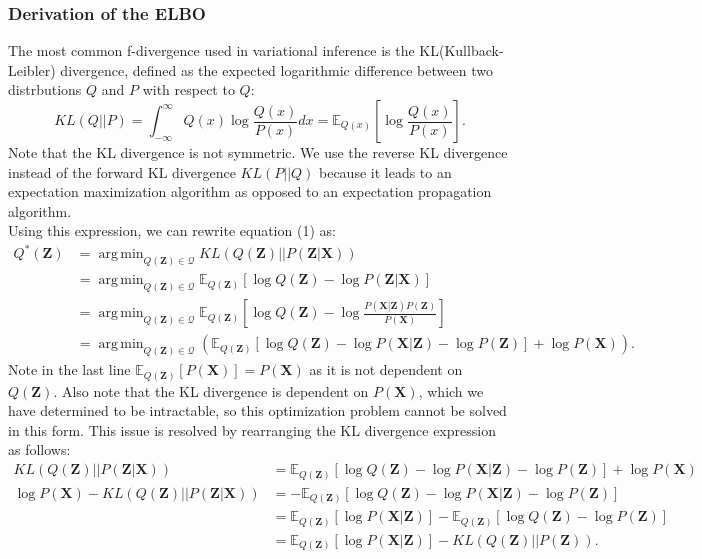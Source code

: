 \documentclass[a4paper,12pt]{article}
\DeclareMathOperator*{\argmin}{arg\,min}
\numberwithin{equation}{section}
\begin{document}
\subsubsection{Derivation of the ELBO}
The most common f-divergence used in variational inference is the KL(Kullback-Leibler) divergence, defined as the expected logarithmic difference between two distrbutions $Q$ and $P$ with respect to $Q$:
\begin{equation*}
KL(Q||P)=\int_{-\infty}^\infty Q(x)\log \frac{Q(x)}{P(x)}dx=\mathbb{E}_{Q(x)}\left[\log\frac{Q(x)}{P(x)}\right].
\end{equation*}
Note that the KL divergence is not symmetric. We use the reverse KL divergence instead of the forward KL divergence $KL(P||Q)$ because it leads to an expectation maximization algorithm as opposed to an expectation propagation algorithm.\\
Using this expression, we can rewrite equation (1) as:
\begin{align*}
Q^*(\textbf{Z})&=\argmin_{Q(\textbf{Z})\in \mathcal{Q}}KL(Q(\textbf{Z})||P(\textbf{Z}|\textbf{X}))\\
&= \argmin_{Q(\textbf{Z})\in \mathcal{Q}} \mathbb{E}_{Q(\textbf{Z})}[\log Q(\textbf{Z})-\log P(\textbf{Z}|\textbf{X})]\\
&= \argmin_{Q(\textbf{Z})\in \mathcal{Q}} \mathbb{E}_{Q(\textbf{Z})}\left[\log Q(\textbf{Z})-\log\frac{P(\textbf{X}|\textbf{Z})P(\textbf{Z})}{P(\textbf{X})}\right]\\
&= \argmin_{Q(\textbf{Z})\in \mathcal{Q}} \left(\mathbb{E}_{Q(\textbf{Z})}[\log Q(\textbf{Z})-\log P(\textbf{X}|\textbf{Z})-\log P(\textbf{Z})]+\log P(\textbf{X})\right).
\end{align*}
Note in the last line $\mathbb{E}_{Q(\textbf{Z})}[P(\textbf{X})]=P(\textbf{X})$ as it is not dependent on $Q(\textbf{Z})$. Also note that the KL divergence is dependent on $P(\textbf{X})$, which we have determined to be intractable, so this optimization problem cannot be solved in this form. This issue is resolved by rearranging the KL divergence expression as follows:
\begin{align}
KL(Q(\textbf{Z})||P(\textbf{Z}|\textbf{X}))&=\mathbb{E}_{Q(\textbf{Z})}[\log Q(\textbf{Z})-\log P(\textbf{X}|\textbf{Z})-\log P(\textbf{Z})]+\log P(\textbf{X}) \nonumber \\
\log P(\textbf{X})-KL(Q(\textbf{Z})||P(\textbf{Z}|\textbf{X}))&=-\mathbb{E}_{Q(\textbf{Z})}[\log Q(\textbf{Z})-\log P(\textbf{X}|\textbf{Z})-\log P(\textbf{Z})]\nonumber \\
&=\mathbb{E}_{Q(\textbf{Z})}[\log P(\textbf{X}|\textbf{Z})]-\mathbb{E}_{Q(\textbf{Z})}[\log Q(\textbf{Z})-\log P(\textbf{Z})]\nonumber \\
&=\mathbb{E}_{Q(\textbf{Z})}[\log P(\textbf{X}|\textbf{Z})]-KL(Q(\textbf{Z})||P(\textbf{Z})).
\end{align}
\end{document}
